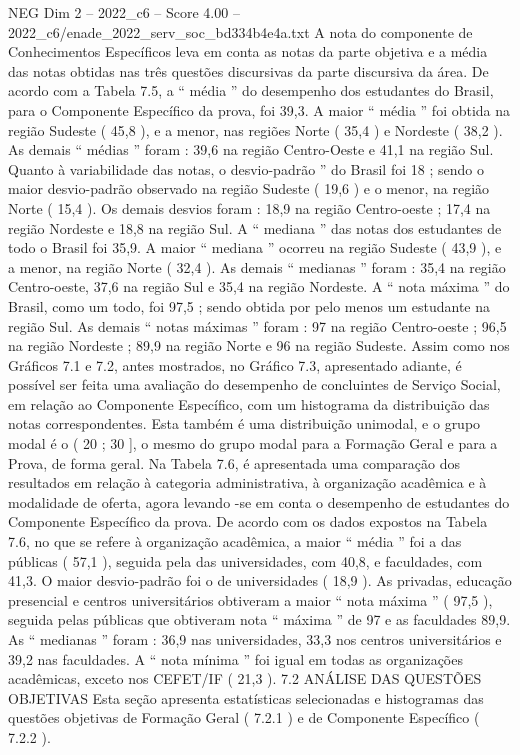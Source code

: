 \begin{textsample}{NEG Dim 2 – 2022\_c6 – Score 4.00 – 2022\_c6/enade\_2022\_serv\_soc\_bd334b4e4a.txt}
A nota do componente de Conhecimentos Específicos leva em conta as notas da parte objetiva e a média das notas obtidas nas três questões discursivas da parte discursiva da área.
De acordo com a Tabela 7.5, a “ média ” do desempenho dos estudantes do Brasil, para o Componente Específico da prova, foi 39,3.
A maior “ média ” foi obtida na região Sudeste ( 45,8 ), e a menor, nas regiões Norte ( 35,4 ) e Nordeste ( 38,2 ).
As demais “ médias ” foram : 39,6 na região Centro-Oeste e 41,1 na região Sul.
Quanto à variabilidade das notas, o desvio-padrão ” do Brasil foi 18 ; sendo o maior desvio-padrão observado na região Sudeste ( 19,6 ) e o menor, na região Norte ( 15,4 ).
Os demais desvios foram : 18,9 na região Centro-oeste ; 17,4 na região Nordeste e 18,8 na região Sul.
A “ mediana ” das notas dos estudantes de todo o Brasil foi 35,9.
A maior “ mediana ” ocorreu na região Sudeste ( 43,9 ), e a menor, na região Norte ( 32,4 ).
As demais “ medianas ” foram : 35,4 na região Centro-oeste, 37,6 na região Sul e 35,4 na região Nordeste.
A “ nota máxima ” do Brasil, como um todo, foi 97,5 ; sendo obtida por pelo menos um estudante na região Sul.
As demais “ notas máximas ” foram : 97 na região Centro-oeste ; 96,5 na região Nordeste ; 89,9 na região Norte e 96 na região Sudeste.
Assim como nos Gráficos 7.1 e 7.2, antes mostrados, no Gráfico 7.3, apresentado adiante, é possível ser feita uma avaliação do desempenho de concluintes de Serviço Social, em relação ao Componente Específico, com um histograma da distribuição das notas correspondentes.
Esta também é uma distribuição unimodal, e o grupo modal é o ( 20 ; 30 ], o mesmo do grupo modal para a Formação Geral e para a Prova, de forma geral.
Na Tabela 7.6, é apresentada uma comparação dos resultados em relação à categoria administrativa, à organização acadêmica e à modalidade de oferta, agora levando -se em conta o desempenho de estudantes do Componente Específico da prova.
De acordo com os dados expostos na Tabela 7.6, no que se refere à organização acadêmica, a maior “ média ” foi a das públicas ( 57,1 ), seguida pela das universidades, com 40,8, e faculdades, com 41,3.
O maior desvio-padrão foi o de universidades ( 18,9 ).
As privadas, educação presencial e centros universitários obtiveram a maior “ nota máxima ” ( 97,5 ), seguida pelas públicas que obtiveram nota “ máxima ” de 97 e as faculdades 89,9.
As “ medianas ” foram : 36,9 nas universidades, 33,3 nos centros universitários e 39,2 nas faculdades.
A “ nota mínima ” foi igual em todas as organizações acadêmicas, exceto nos CEFET/IF ( 21,3 ). 7.2 ANÁLISE DAS QUESTÕES OBJETIVAS Esta seção apresenta estatísticas selecionadas e histogramas das questões objetivas de Formação Geral ( 7.2.1 ) e de Componente Específico ( 7.2.2 ).

\end{textsample}
